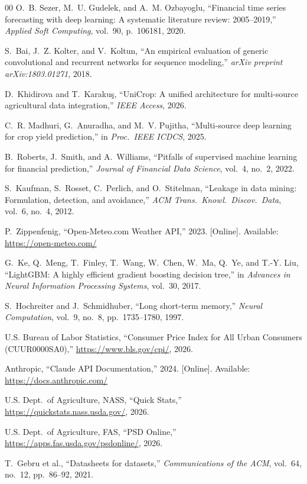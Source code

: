 \documentclass[conference]{IEEEtran}
\begin{document}
\begin{thebibliography}{00}
O.~B. Sezer, M.~U. Gudelek, and A.~M. Ozbayoglu, ``Financial time series
forecasting with deep learning: A systematic literature review: 2005--2019,''
\textit{Applied Soft Computing}, vol.~90, p.~106181, 2020.

S.~Bai, J.~Z. Kolter, and V.~Koltun, ``An empirical evaluation of generic
convolutional and recurrent networks for sequence modeling,''
\textit{arXiv preprint arXiv:1803.01271}, 2018.

D.~Khidirova and T.~Karakuş, ``UniCrop: A unified architecture for
multi-source agricultural data integration,''
\textit{IEEE Access}, 2026.

C.~R. Madhuri, G.~Anuradha, and M.~V. Pujitha,
``Multi-source deep learning for crop yield prediction,''
in \textit{Proc.\ IEEE ICDCS}, 2025.

B.~Roberts, J.~Smith, and A.~Williams, ``Pitfalls of supervised machine
learning for financial prediction,''
\textit{Journal of Financial Data Science}, vol.~4, no.~2, 2022.

S.~Kaufman, S.~Rosset, C.~Perlich, and O.~Stitelman,
``Leakage in data mining: Formulation, detection, and avoidance,''
\textit{ACM Trans.\ Knowl.\ Discov.\ Data}, vol.~6, no.~4, 2012.

P.~Zippenfenig, ``Open-Meteo.com Weather API,'' 2023.
[Online]. Available: \url{https://open-meteo.com/}

G.~Ke, Q.~Meng, T.~Finley, T.~Wang, W.~Chen, W.~Ma, Q.~Ye, and T.-Y. Liu,
``LightGBM: A highly efficient gradient boosting decision tree,''
in \textit{Advances in Neural Information Processing Systems}, vol.~30, 2017.

S.~Hochreiter and J.~Schmidhuber, ``Long short-term memory,''
\textit{Neural Computation}, vol.~9, no.~8, pp.~1735--1780, 1997.

U.S. Bureau of Labor Statistics,
``Consumer Price Index for All Urban Consumers (CUUR0000SA0),''
\url{https://www.bls.gov/cpi/}, 2026.

Anthropic, ``Claude API Documentation,'' 2024.
[Online]. Available: \url{https://docs.anthropic.com/}

U.S. Dept.\ of Agriculture, NASS, ``Quick Stats,''
\url{https://quickstats.nass.usda.gov/}, 2026.

U.S. Dept.\ of Agriculture, FAS, ``PSD Online,''
\url{https://apps.fas.usda.gov/psdonline/}, 2026.

T.~Gebru et al., ``Datasheets for datasets,''
\textit{Communications of the ACM}, vol.~64, no.~12, pp.~86--92, 2021.
\end{thebibliography}
\end{document}
